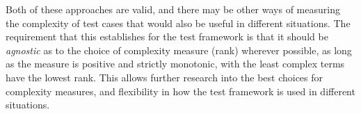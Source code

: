 Both of these approaches are valid,
and there may be other ways of measuring the complexity of test cases
that would also be useful in different situations.
The requirement that this establishes for the test framework is that
it should be \emph{agnostic} as to the choice of complexity measure (rank) wherever possible,
as long as the measure is positive and strictly monotonic,
with the least complex terms have the lowest rank.
This allows further research into the best choices for complexity measures,
and flexibility in how the test framework is used in different situations.

%
%
%
%
%
